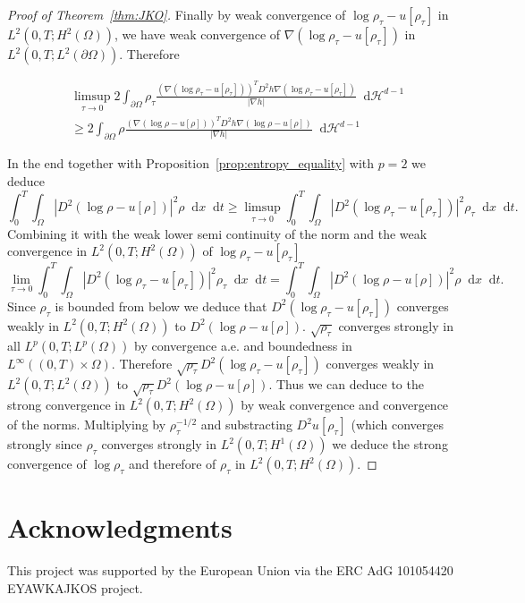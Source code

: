 \documentclass[a4paper,twosided, 11pt]{article}
\newcommand {\f}   {\frac}
\newcommand {\p}   {\partial}
\theoremstyle{plain}
\theoremstyle{remark}
\newcommand{\diff}{\mathop{}\!\mathrm{d}}
\numberwithin{equation}{section}
\begin{document}
\begin{proof}[Proof of Theorem~\ref{thm:JKO}]
Finally by weak convergence of $\log\rho_{\tau} -u[\rho_{\tau}]$ in $L^{2}(0,T; H^{2}(\Omega))$, we have weak convergence of $\nabla (\log \rho_{\tau} -u[\rho_{\tau}])$ in $L^{2}(0,T; L^{2}(\p\Omega))$. Therefore

\begin{align*}
&\limsup_{\tau\to 0}2\int_{\p\Omega}\rho_{\tau} \f{(\nabla (\log \rho_{\tau}-u[\rho_{\tau}]))^{T} D^{2} h \nabla (\log \rho_{\tau}-u[\rho_{\tau}])}{|\nabla h|}\diff \mathcal{H}^{d-1} \\
&\ge 2\int_{\p\Omega}\rho \f{(\nabla (\log \rho-u[\rho]))^{T} D^{2} h \nabla (\log \rho-u[\rho])}{|\nabla h|}\diff \mathcal{H}^{d-1}
\end{align*}


In the end together with Proposition~\ref{prop:entropy_equality} with $p=2$ we deduce
$$
\int_{0}^{T}\int_{\Omega} |D^{2}(\log \rho-u[\rho])|^2\rho\diff x \diff t \ge \limsup_{\tau\to 0}\int_{0}^{T}\int_{\Omega} |D^{2}(\log \rho_{\tau}-u[\rho_{\tau}])|^2\rho_{\tau}\diff x \diff t.  
$$
Combining it with the weak lower semi continuity of the norm and the weak convergence in $L^{2}(0,T; H^{2}(\Omega))$ of $\log \rho_{\tau} -u[\rho_{\tau}]$
$$
 \lim_{\tau\to 0}\int_{0}^{T}\int_{\Omega} |D^{2}(\log \rho_{\tau} -u[\rho_{\tau}])|^2\rho_{\tau}\diff x \diff t =\int_{0}^{T}\int_{\Omega} |D^{2}(\log \rho-u[\rho])|^2\rho\diff x \diff t.
$$
Since $\rho_{\tau}$ is bounded from below we deduce that $D^{2}(\log\rho_{\tau}-u[\rho_{\tau}])$ converges weakly in $L^{2}(0,T; H^{2}(\Omega))$ to $D^{2}(\log \rho -u[\rho])$. $\sqrt{\rho_{\tau}}$ converges strongly in all $L^{p}(0,T; L^{p}(\Omega))$ by convergence a.e. and boundedness in $L^{\infty}((0,T)\times\Omega)$. Therefore $\sqrt{\rho_{\tau}}D^{2}(\log\rho_{\tau} -u[\rho_{\tau}])$ converges weakly in $L^{2}(0,T; L^{2}(\Omega))$ to $\sqrt{\rho_{\tau}}D^{2}(\log\rho -u[\rho])$.  Thus we can deduce to the strong convergence in $L^{2}(0,T; H^{2}(\Omega))$ by weak convergence and convergence of the norms. Multiplying by $\rho_{\tau}^{-1/2}$ and substracting $D^{2}u[\rho_{\tau}]$ (which converges strongly since $\rho_{\tau}$ converges strongly in $L^{2}(0,T ;H^{1}(\Omega))$ we deduce the strong convergence of $\log \rho_{\tau}$ and therefore of $\rho_{\tau}$ in $L^{2}(0,T; H^{2}(\Omega)).$ 
\end{proof}


\section*{Acknowledgments}
This project was supported by the European Union via the ERC
AdG 101054420 EYAWKAJKOS project.
\end{document}
